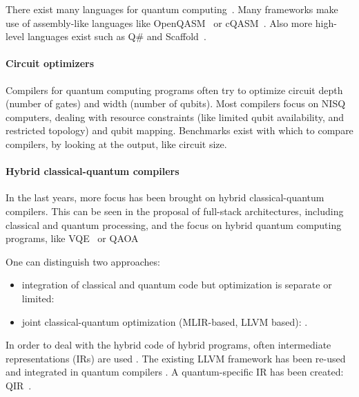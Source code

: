 There exist many languages for quantum computing~\cite{chong_programming_2017, heim_quantum_2020}.
Many frameworks make use of assembly-like languages like OpenQASM~\cite{cross_open_2017} or cQASM~\cite{khammassi_cqasm_2018}.
Also more high-level languages exist such as Q\# and Scaffold~\cite{svore_q_2018, litteken_updated_2020, heim_quantum_2020}.

\paragraph{Circuit optimizers}
Compilers for quantum computing programs often try to optimize circuit depth (number of gates) and width (number of qubits).
Most compilers focus on \ac{NISQ} computers, dealing with resource constraints (like limited qubit availability, and restricted topology)\cite{chong_programming_2017, murali_full-stack_2019, bandic_full-stack_2022} and qubit mapping\cite{li_tackling_2019, zhang_context-sensitive_2020, bandic_mapping_2023, nishio_extracting_2020}.
Benchmarks exist with which to compare compilers, by looking at the output, like circuit size.

\paragraph{Hybrid classical-quantum compilers}
In the last years, more focus has been brought on hybrid classical-quantum compilers.
This can be seen in the proposal of full-stack architectures, including classical and quantum processing\cite{murali_full-stack_2019, khammassi_openql_2021, mccaskey_xacc_2020}, and the focus on hybrid quantum computing programs, like \acf{VQE}~\cite{diadamo2021distributed, liu2022layer} or \acf{QAOA}~\cite{farhi2014quantum}

One can distinguish two approaches:
\begin{itemize}
\item integration of classical and quantum code but optimization is separate or limited: \cite{litteken_updated_2020, fux_quingo_2021, khalate_llvm-based_2022, younis_quantum_2022}
\item joint classical-quantum optimization (MLIR-based, LLVM based): \cite{mccaskey_mlir_2021, ittah_enabling_2022, nguyen_retargetable_2022, peduri_qssa_2022}.
\end{itemize}

In order to deal with the hybrid code of hybrid programs, often intermediate representations (IRs) are used \cite{nigam_compiler_2021, nishio_inquir_2023}.
The existing LLVM framework has been re-used and integrated in quantum compilers \cite{murali_noise-adaptive_2019, murali_full-stack_2019, litteken_updated_2020}.
A quantum-specific IR has been created: QIR~\cite{haner_software_2018, geller_introducing_2020}.

